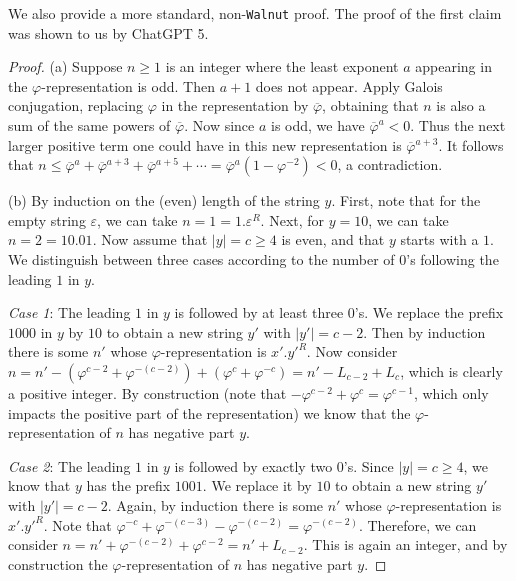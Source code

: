 \documentclass[12pt,reqno]{article}
\begin{document}
We also provide a more standard, non-{\tt Walnut} proof. The proof of the first claim was shown to us by ChatGPT 5.

\begin{proof}
(a) Suppose $n \geq 1$ is an integer where the least exponent $a$ appearing in the
$\varphi$-represen\-tation is odd.
Then $a+1$ does not appear.
Apply Galois conjugation, replacing
$\varphi$ in the representation by
$\overline{\varphi}$, obtaining that $n$ is also a sum of the same powers of $\overline{\varphi}$.
Now since $a$ is odd, we have
$\overline{\varphi}^a < 0$.  Thus
the next larger positive term one could have in this new representation is $\overline{\varphi}^{a+3}$.  It 
follows that $n \leq \overline{\varphi}^a + \overline{\varphi}^{a+3} + \overline{\varphi}^{a+5} + \cdots = \overline{\varphi}^a (1-\varphi^{-2}) < 0$, a contradiction.

\medskip

(b) By induction on the (even) length of the string $y$. First, note that for the empty string $\varepsilon$, we can take $n=1=1.\varepsilon^R$. Next, for $y = 10$, we can take $n=2=10.01$. Now assume that $|y|=c\geq 4$ is even, and that $y$ starts with a $1$. 
We distinguish between three cases according to the number of $0$'s following the leading $1$ in $y$.

\textit{Case 1}: The leading $1$ in $y$ is followed by at least three $0$'s. We replace the prefix $1000$ in $y$ by $10$ to obtain a new string $y'$ with $|y'| = c-2$. 
Then by induction there is some $n'$ whose $\varphi$-representation is $x'.{y'}^R$.
Now consider 
$n = n' - (\varphi^{c-2} + \varphi^{-(c-2)}) + (\varphi^{c} + \varphi^{-c}) = n' - L_{c-2} + L_c$, which is clearly a positive integer.
By construction (note that $- \varphi^{c-2} + \varphi^{c} = \varphi^{c-1}$, which only impacts the positive part of the representation) we know that the $\varphi$-representation of $n$ has negative part $y$.

\textit{Case 2}: The leading $1$ in $y$ is followed by exactly two $0$'s. Since $|y|=c\geq 4$, we know that $y$ has the prefix $1001$. We replace it by $10$ to obtain a new string $y'$ with $|y'| = c-2$. Again, by induction there is some $n'$ whose $\varphi$-representation is $x'.{y'}^R$. 
Note that $\varphi^{-c} +  \varphi^{-(c-3)} - \varphi^{-(c-2)} = \varphi^{-(c-2)}$.
Therefore, we can consider
$n = n' + \varphi^{-(c-2)} + \varphi^{c-2} = n' + L_{c-2}$.
This is again an integer, and by construction the $\varphi$-representation of $n$ has negative part $y$.


\end{proof}
\end{document}
